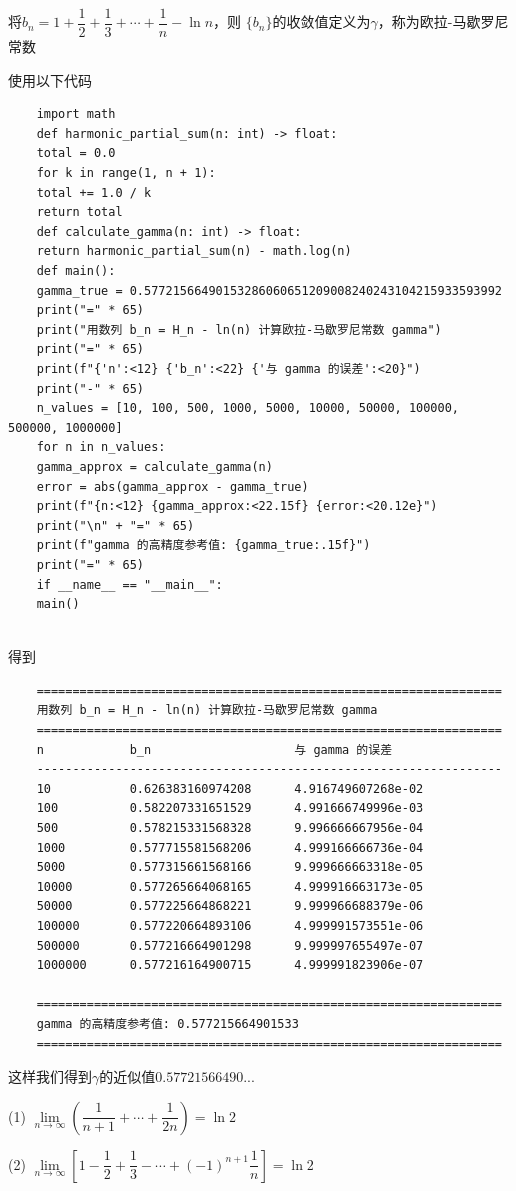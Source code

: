 \begin{definition}
	将$b_n = 1 + \dfrac{1}{2} + \dfrac{1}{3} + \cdots + \dfrac{1}{n} - \ln n$，则 $\{b_n\}$的收敛值定义为$\gamma$，称为欧拉-马歇罗尼常数
\end{definition}
使用以下代码
\begin{verbatim}
	import math
	def harmonic_partial_sum(n: int) -> float:
	total = 0.0
	for k in range(1, n + 1):
	total += 1.0 / k
	return total
	def calculate_gamma(n: int) -> float:
	return harmonic_partial_sum(n) - math.log(n)
	def main():
	gamma_true = 0.57721566490153286060651209008240243104215933593992
	print("=" * 65)
	print("用数列 b_n = H_n - ln(n) 计算欧拉-马歇罗尼常数 gamma")
	print("=" * 65)
	print(f"{'n':<12} {'b_n':<22} {'与 gamma 的误差':<20}")
	print("-" * 65)
	n_values = [10, 100, 500, 1000, 5000, 10000, 50000, 100000, 500000, 1000000]
	for n in n_values:
	gamma_approx = calculate_gamma(n)
	error = abs(gamma_approx - gamma_true)
	print(f"{n:<12} {gamma_approx:<22.15f} {error:<20.12e}")
	print("\n" + "=" * 65)
	print(f"gamma 的高精度参考值: {gamma_true:.15f}")
	print("=" * 65)
	if __name__ == "__main__":
	main()
	
\end{verbatim}
得到
\begin{verbatim}
	=================================================================
	用数列 b_n = H_n - ln(n) 计算欧拉-马歇罗尼常数 gamma
	=================================================================
	n            b_n                    与 gamma 的误差         
	-----------------------------------------------------------------
	10           0.626383160974208      4.916749607268e-02  
	100          0.582207331651529      4.991666749996e-03  
	500          0.578215331568328      9.996666667956e-04  
	1000         0.577715581568206      4.999166666736e-04  
	5000         0.577315661568166      9.999666663318e-05  
	10000        0.577265664068165      4.999916663173e-05  
	50000        0.577225664868221      9.999966688379e-06  
	100000       0.577220664893106      4.999991573551e-06  
	500000       0.577216664901298      9.999997655497e-07  
	1000000      0.577216164900715      4.999991823906e-07  
	
	=================================================================
	gamma 的高精度参考值: 0.577215664901533
	=================================================================
\end{verbatim}
这样我们得到$\gamma$的近似值$0.57721566490...$
\begin{corollary}
	(1) $\lim\limits_{n \to \infty} \left(\dfrac{1}{n+1} + \cdots + \dfrac{1}{2n}\right) = \ln 2$
	
	(2) $\lim\limits_{n \to \infty} \left[1 - \dfrac{1}{2} + \dfrac{1}{3} - \cdots + (-1)^{n+1} \dfrac{1}{n}\right] = \ln 2$
\end{corollary}
